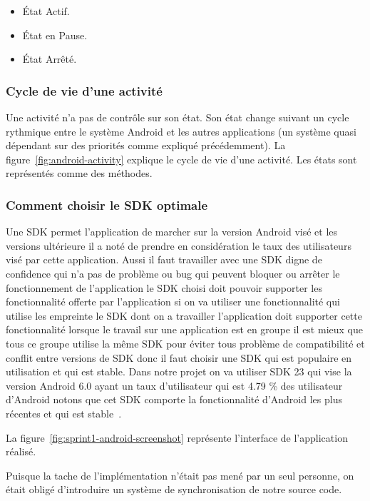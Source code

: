 \begin{itemize}
    \item État Actif.
    \item État en Pause.
    \item État Arrêté.
\end{itemize}

\subsubsection{Cycle de vie d'une activité}

Une activité n'a pas de contrôle sur son état. Son état change suivant un cycle
rythmique entre le système Android et les autres applications (un système quasi
dépendant sur des priorités comme expliqué précédemment). La
figure~\ref{fig:android-activity} explique le cycle de vie d'une activité. Les
états sont représentés comme des méthodes.



\subsubsection{Comment choisir le SDK optimale}

Une SDK permet l'application de marcher sur la version Android visé et les
versions ultérieure il a noté de prendre en considération le taux des
utilisateurs visé par cette application. Aussi il faut travailler avec une SDK
digne de confidence qui n'a pas de problème ou bug qui peuvent bloquer ou
arrêter le fonctionnement de l'application le SDK choisi doit pouvoir supporter
les fonctionnalité offerte par l'application si on va utiliser une
fonctionnalité qui utilise les empreinte le SDK dont on a travailler
l'application doit supporter cette fonctionnalité lorsque le travail sur une
application est en groupe il est mieux que tous ce groupe utilise la même SDK
pour éviter tous problème de compatibilité et conflit entre versions de SDK
donc il faut choisir une SDK qui est populaire en utilisation et qui est
stable. Dans notre projet on va utiliser SDK 23 qui vise la version Android 6.0
ayant un taux d'utilisateur qui est 4.79 \% des utilisateur d'Android notons que
cet SDK comporte la fonctionnalité d'Android les plus récentes et qui est
stable~\cite{android-sdk}.

La figure~\ref{fig:sprint1-android-screenshot} représente l'interface de
l'application réalisé.

Puisque la tache de l'implémentation n'était pas mené par un seul personne, on
était obligé d'introduire un système de synchronisation de notre source code.

